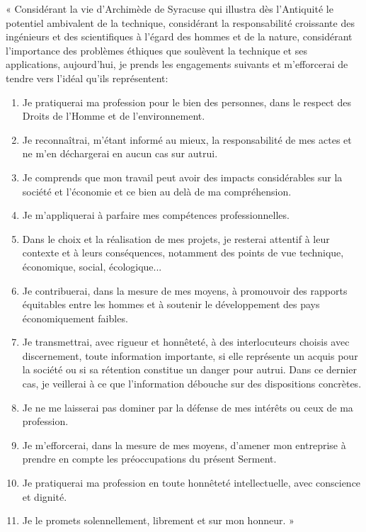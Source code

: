 	« Considérant la vie d'Archimède de Syracuse qui illustra dès l'Antiquité le potentiel ambivalent de la technique, considérant la responsabilité croissante des ingénieurs et des scientifiques à l'égard des hommes et de la nature, considérant l'importance des problèmes éthiques que soulèvent la technique et ses applications, aujourd'hui, je prends les engagements suivants et m'efforcerai de tendre vers l'idéal qu'ils représentent:
	\begin{enumerate}
		\item Je pratiquerai ma profession pour le bien des personnes, dans le respect des Droits de l'Homme et de l'environnement.

		\item Je reconnaîtrai, m'étant informé au mieux, la responsabilité de mes actes et ne m'en déchargerai en aucun cas sur autrui.

		\item Je comprends que mon travail peut avoir des impacts considérables sur la société et l'économie et ce bien au delà de ma compréhension.

		\item Je m'appliquerai à parfaire mes compétences professionnelles.

		\item Dans le choix et la réalisation de mes projets, je resterai attentif à leur contexte et à leurs conséquences, notamment des points de vue technique, économique, social, écologique...

		\item Je contribuerai, dans la mesure de mes moyens, à promouvoir des rapports équitables entre les hommes et à soutenir le développement des pays économiquement faibles.

		\item Je transmettrai, avec rigueur et honnêteté, à des interlocuteurs choisis avec discernement, toute information importante, si elle représente un acquis pour la société ou si sa rétention constitue un danger pour autrui. Dans ce dernier cas, je veillerai à ce que l'information débouche sur des dispositions concrètes.

		\item Je ne me laisserai pas dominer par la défense de mes intérêts ou ceux de ma profession.

		\item Je m'efforcerai, dans la mesure de mes moyens, d'amener mon entreprise à prendre en compte les préoccupations du présent Serment.

		\item Je pratiquerai ma profession en toute honnêteté intellectuelle, avec conscience et dignité.
		
		\item Je le promets solennellement, librement et sur mon honneur. »
\end{enumerate}
